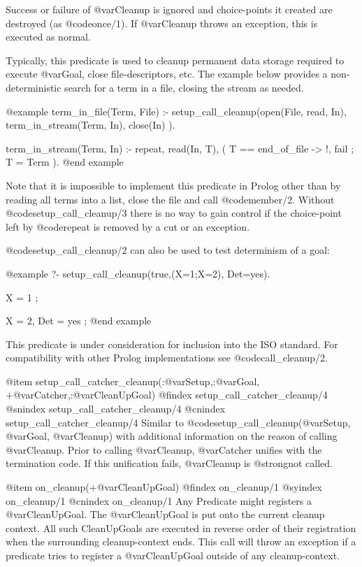 {{{{{{{{Success or failure of @var{Cleanup} is ignored and choice-points it
created are destroyed (as @code{once/1}). If @var{Cleanup} throws an exception,
this is executed as normal.

Typically, this predicate is used to cleanup permanent data storage
required to execute @var{Goal}, close file-descriptors, etc. The example
below provides a non-deterministic search for a term in a file, closing
the stream as needed.

@example
term_in_file(Term, File) :-
	setup_call_cleanup(open(File, read, In),
			   term_in_stream(Term, In),
			   close(In) ).

term_in_stream(Term, In) :-
	repeat,
	read(In, T),
	(   T == end_of_file
	->  !, fail
	;   T = Term
	).
@end example

Note that it is impossible to implement this predicate in Prolog other than
by reading all terms into a list, close the file and call @code{member/2}.
Without @code{setup_call_cleanup/3} there is no way to gain control if the
choice-point left by @code{repeat} is removed by a cut or an exception.

@code{setup_call_cleanup/2} can also be used to test determinism of a goal:

@example
?- setup_call_cleanup(true,(X=1;X=2), Det=yes).

X = 1 ;

X = 2,
Det = yes ;
@end example

This predicate is under consideration for inclusion into the ISO standard.
For compatibility with other Prolog implementations see @code{call_cleanup/2}.

 @item setup_call_catcher_cleanup(:@var{Setup},:@var{Goal}, +@var{Catcher},:@var{CleanUpGoal})
@findex setup_call_catcher_cleanup/4
@snindex setup_call_catcher_cleanup/4
@cnindex setup_call_catcher_cleanup/4
Similar to @code{setup_call_cleanup(@var{Setup}, @var{Goal}, @var{Cleanup})} with
additional information on the reason of calling @var{Cleanup}.  Prior
to calling @var{Cleanup}, @var{Catcher} unifies with the termination
code.  If this unification fails, @var{Cleanup} is
@strong{not} called.


@item on_cleanup(+@var{CleanUpGoal})
@findex on_cleanup/1
@syindex on_cleanup/1
@cnindex on_cleanup/1
Any Predicate might registers a @var{CleanUpGoal}. The
@var{CleanUpGoal} is put onto the current cleanup context. All such
CleanUpGoals are executed in reverse order of their registration when
the surrounding cleanup-context ends. This call will throw an exception
if a predicate tries to register a @var{CleanUpGoal} outside of any
cleanup-context.

}}}}}}}}
